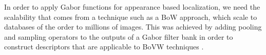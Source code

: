 In order to apply Gabor functions for appearance based localization, we need the scalability that comes from a technique such as a BoW approach, which scale to databases of the order to millions of images. This was achieved by adding pooling and sampling operators to the outputs of a Gabor filter bank in order to construct descriptors that are applicable to BoVW techniques \citep{nister2006scalable}.  

%
%
%
